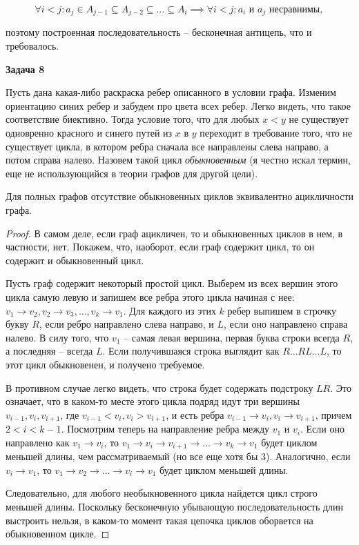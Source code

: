 		\begin{equation*}
			\forall i < j: a_j \in A_{j-1} \subseteq A_{j-2} \subseteq \dots \subseteq A_i \implies \forall i < j: a_i \text{ и } a_j \text{ несравнимы},
		\end{equation*}

		поэтому построенная последовательность -- бесконечная антицепь, что и требовалось.


	\begin{center}
    \textbf{Задача 8}
\end{center}
		Пусть дана какая-либо раскраска ребер описанного в условии графа. Изменим ориентацию синих ребер и забудем про цвета всех ребер. Легко видеть, что такое соответствие биективно. Тогда условие того, что для любых $x < y$ не существует одновренно красного и синего путей из $x$ в $y$ переходит в требование того, что не существует цикла, в котором ребра сначала все направлены слева направо, а потом справа налево. Назовем такой цикл \textit{обыкновенным} (я честно искал термин, еще не использующийся в теории графов для другой цели).

		\begin{lemma}
			Для полных графов отсутствие обыкновенных циклов эквивалентно ацикличности графа.
		\end{lemma}

		\begin{proof}
			В самом деле, если граф ацикличен, то и обыкновенных циклов в нем, в частности, нет. Покажем, что, наоборот, если граф содержит цикл, то он содержит и обыкновенный цикл.

			Пусть граф содержит некоторый простой цикл. Выберем из всех вершин этого цикла самую левую и запишем все ребра этого цикла начиная с нее: $v_1 \to v_2, v_2 \to v_3, \dots, v_k \to v_1$. Для каждого из этих $k$ ребер выпишем в строчку букву $R$, если ребро направлено слева направо, и $L$, если оно направлено справа налево. В силу того, что $v_1$ -- самая левая вершина, первая буква строки всегда $R$, а последняя -- всегда $L$. Если получившаяся строка выглядит как $R \dots RL \dots L$, то этот цикл обыкновенен, и получено требуемое.

			В противном случае легко видеть, что строка будет содержать подстроку $LR$. Это означает, что в каком-то месте этого цикла подряд идут три вершины $v_{i-1}, v_i, v_{i+1}$, где $v_{i-1} < v_i, v_i > v_{i+1}$, и есть ребра $v_{i-1} \to v_i, v_i \to v_{i+1}$, причем $2 < i < k-1$. Посмотрим теперь на направление ребра между $v_1$ и $v_i$. Если оно направлено как $v_1 \to v_i$, то $v_1 \to v_i \to v_{i+1} \to \dots \to v_k \to v_1$ будет циклом меньшей длины, чем рассматриваемый (но все еще хотя бы $3$). Аналогично, если $v_i \to v_1$, то $v_1 \to v_2 \to \dots \to v_i \to v_1$ будет циклом меньшей длины.

			Следовательно, для любого необыкновенного цикла найдется цикл строго меньшей длины. Поскольку бесконечную убывающую последовательность длин выстроить нельзя, в каком-то момент такая цепочка циклов оборвется на обыкновенном цикле.
		\end{proof}

